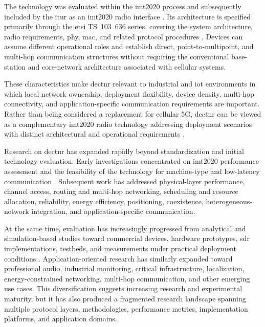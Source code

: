 The technology was evaluated within the \gls{imt2020} process and subsequently included by the \gls{itur} as an \gls{imt2020} radio interface \cite{itur_m2150, maliatsosEvaluationIMT2020Candidate2022a, smidaETSIDECT2020Component2023}. Its architecture is specified primarily through the \gls{etsi} TS~103~636 series, covering the system architecture, radio requirements, \gls{phy}, \gls{mac}, and related protocol procedures \cite{etsi_ts103636_1, etsi_ts103636_2, etsi_ts103636_3, etsi_ts103636_4, etsi_ts103636_5}. Devices can assume different operational roles and establish direct, point-to-multipoint, and multi-hop communication structures without requiring the conventional base-station and core-network architecture associated with cellular systems.

These characteristics make \gls{dectnr} relevant to industrial and \gls{iot} environments in which local network ownership, deployment flexibility, device density, multi-hop connectivity, and application-specific communication requirements are important. Rather than being considered a replacement for cellular 5G, \gls{dectnr} can be viewed as a complementary \gls{imt2020} radio technology addressing deployment scenarios with distinct architectural and operational requirements \cite{kovalchukovDECT2020NewRadio2022, perez-guiraoDECTNRUnveiling2022, smidaETSIDECT2020Component2023}.

Research on \gls{dectnr} has expanded rapidly beyond standardization and initial technology evaluation. Early investigations concentrated on \gls{imt2020} performance assessment and the feasibility of the technology for machine-type and low-latency communication \cite{maliatsosEvaluationIMT2020Candidate2022a, smidaETSIDECT2020Component2023}. Subsequent work has addressed physical-layer performance, channel access, routing and multi-hop networking, scheduling and resource allocation, reliability, energy efficiency, positioning, coexistence, heterogeneous-network integration, and application-specific communication.

At the same time, evaluation has increasingly progressed from analytical and simulation-based studies toward commercial devices, hardware prototypes, \gls{sdr} implementations, testbeds, and measurements under practical deployment conditions \cite{fagerholmFPGAbasedDECT2020New2024, wassmannPerformanceDECT2020NR2024, bandaraExperimentalValidationAnalysis2025, haqueDECT2020NRLink2025, grafWhatExpectWhen2026}. Application-oriented research has similarly expanded toward professional audio, industrial monitoring, critical infrastructure, localization, energy-constrained networking, multi-hop communication, and other emerging use cases. This diversification suggests increasing research and experimental maturity, but it has also produced a fragmented research landscape spanning multiple protocol layers, methodologies, performance metrics, implementation platforms, and application domains.

